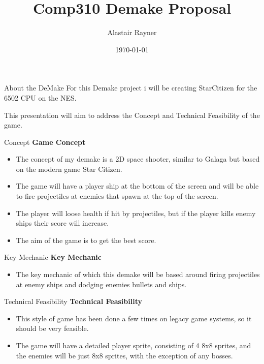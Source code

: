 \documentclass{beamer}
\title{Comp310 Demake Proposal}
\author{Alastair Rayner}
\date{\today}
\begin{document}
\maketitle


\begin{frame}{About the DeMake}
	  For this Demake project i will be creating StarCitizen for the 6502 CPU on the NES. \pause
	
	 This presentation will aim to address the Concept and Technical Feasibility of the game. \pause
\end{frame}


\begin{frame}{Concept}		
	\textbf{Game Concept} \pause
		\begin{itemize}
			\item The concept of my demake is a 2D space shooter, similar to Galaga but based on the modern game Star Citizen.  \pause
			\item The game will have a player ship at the bottom of the screen and will be able to fire projectiles at enemies that spawn at the top of the screen.\pause
			
			\item The player will loose health if hit by projectiles, but if the player kills enemy ships their score will increase.  \pause

			\item The aim of the game is to get the best score. \pause 	
		\end{itemize}
\end{frame}

\begin{frame}{Key Mechanic}		
	\textbf{Key Mechanic} \pause
		\begin{itemize}
			\item The key mechanic of which this demake will be based around firing projectiles at enemy ships and dodging enemies bullets and ships.  \pause

		\end{itemize}
\end{frame}

\begin{frame}{Technical Feasibility}		
	\textbf{Technical Feasibility} \pause
		\begin{itemize}
			\item This style of game has been done a few times on legacy game systems, so it should be very feasible.  \pause
			\item The game will have a detailed player sprite, consisting of 4 8x8 sprites, and the enemies will be just 8x8 sprites, with the exception of any bosses.  \pause
		\end{itemize}
\end{frame}
\end{document}

